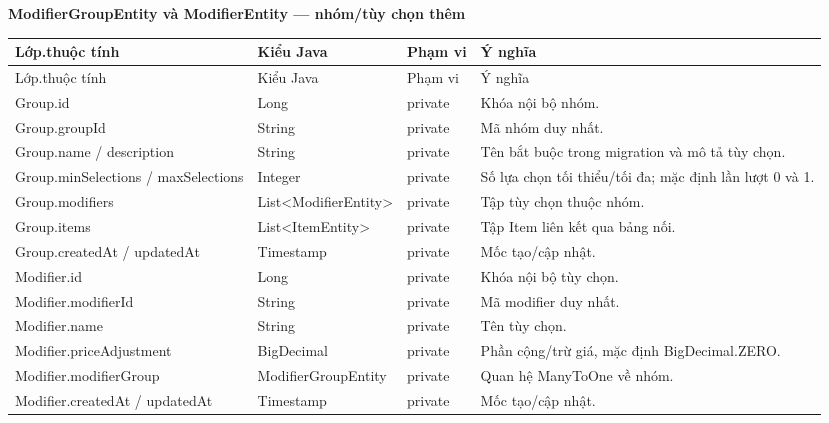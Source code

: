 \documentclass[12pt,a4paper,oneside]{report}
\newcommand{\ClassTableTitle}[1]{\par\medskip\noindent\textbf{#1}\par\smallskip}
\begin{document}
\ClassTableTitle{ModifierGroupEntity và ModifierEntity — nhóm/tùy chọn thêm}
\small\begin{longtable}{@{}D{3.25cm}D{3.35cm}D{1.35cm}D{6.75cm}@{}}\toprule Lớp.thuộc tính & Kiểu Java & Phạm vi & Ý nghĩa\\\midrule\endfirsthead\toprule Lớp.thuộc tính & Kiểu Java & Phạm vi & Ý nghĩa\\\midrule\endhead\bottomrule\endfoot
Group.\allowbreak id & Long & private & Khóa nội bộ nhóm.\\Group.\allowbreak groupId & String & private & Mã nhóm duy nhất.\\Group.\allowbreak name / description & String & private & Tên bắt buộc trong migration và mô tả tùy chọn.\\Group.\allowbreak minSelections / maxSelections & Integer & private & Số lựa chọn tối thiểu/tối đa; mặc định lần lượt 0 và 1.\\Group.\allowbreak modifiers & List\textless ModifierEntity\textgreater & private & Tập tùy chọn thuộc nhóm.\\Group.\allowbreak items & List\textless ItemEntity\textgreater & private & Tập Item liên kết qua bảng nối.\\Group.\allowbreak createdAt / updatedAt & Timestamp & private & Mốc tạo/cập nhật.\\Modifier.\allowbreak id & Long & private & Khóa nội bộ tùy chọn.\\Modifier.\allowbreak modifierId & String & private & Mã modifier duy nhất.\\Modifier.\allowbreak name & String & private & Tên tùy chọn.\\Modifier.\allowbreak priceAdjustment & BigDecimal & private & Phần cộng/trừ giá, mặc định BigDecimal.ZERO.\\Modifier.\allowbreak modifierGroup & ModifierGroupEntity & private & Quan hệ ManyToOne về nhóm.\\Modifier.\allowbreak createdAt / updatedAt & Timestamp & private & Mốc tạo/cập nhật.\\\end{longtable}\normalsize
\end{document}
